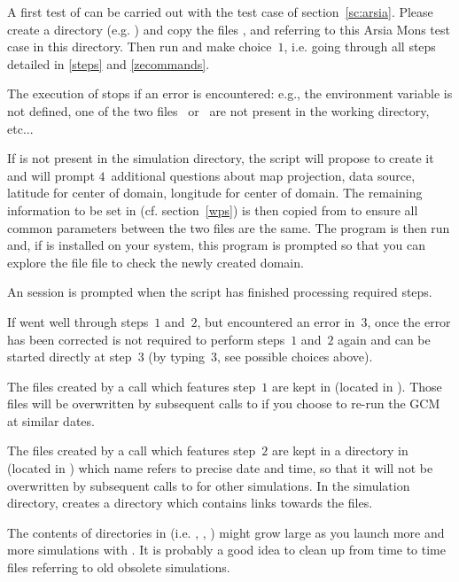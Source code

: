 \sk
\begin{finger}
\item A first test of  can be carried out with the test case of section~\ref{sc:arsia}. Please create a directory (e.g. ) and copy the files ,  and  referring to this Arsia Mons test case in this directory. Then run  and make choice~$1$, i.e. going through all steps detailed in \ref{steps} and \ref{zecommands}. 
\item The execution of  stops if an error is encountered: e.g., the environment variable  is not defined, one of the two files~ or~ are not present in the working directory, etc...
\item If  is not present in the simulation directory, the  script will propose to create it and will prompt $4$~additional questions about map projection, data source, latitude for center of domain, longitude for center of domain. The remaining information to be set in  (cf. section~\ref{wps}) is then copied from  to ensure all common parameters between the two files are the same. The program  is then run and, if  is installed on your system, this program is prompted so that you can explore the file  file to check the newly created domain.
\item An  session is prompted when the  script has finished processing required steps.
\item If  went well through steps~$1$ and~$2$, but encountered an error in~$3$, once the error has been corrected  is not required to perform steps~$1$ and~$2$ again and can be started directly at step~$3$ (by typing~$3$, see possible choices above).
\item The  files created by a  call which features step~$1$ are kept in  (located in ). Those files will be overwritten by subsequent calls to  if you choose to re-run the GCM at similar dates.
\item The  files created by a  call which features step~$2$ are kept in a directory in  (located in ) which name refers to precise date and time, so that it will not be overwritten by subsequent calls to  for other simulations. In the simulation directory,  creates a  directory which contains links towards the  files. 
\item The contents of directories in  (i.e. , , ) might grow large as you launch more and more simulations with . It is probably a good idea to clean up from time to time files referring to old obsolete simulations.   
\end{finger}



\clearemptydoublepage
